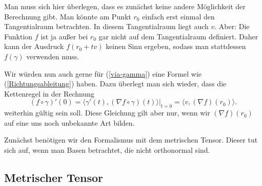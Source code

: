 \documentclass[a4paper,12pt,fleqn,dvipdfmx]{article}
\begin{document}
Man muss sich hier überlegen, dass es zunächst keine andere Möglichkeit
der Berechnung gibt. Man könnte am Punkt $r_0$ einfach erst einmal
den Tangentialraum betrachten. In diesem Tangentialraum liegt auch
$v$. Aber: Die Funktion $f$ ist ja außer bei $r_0$
gar nicht auf dem Tangentialraum definiert. Daher kann der Ausdruck
$f(r_0+tv)$ keinen Sinn ergeben, sodass man stattdessen
$f(\gamma)$ verwenden muss.

Wir würden nun auch gerne für (\ref{via-gamma}) eine Formel
wie (\ref{Richtungsableitung}) haben. Dazu überlegt man sich wieder,
dass die Kettenregel in der Rechnung
\begin{equation}
(f\circ\gamma)'(0)
= \langle \gamma'(t),(\nabla f\circ\gamma)(t)\rangle\Big|_{t=0}
= \langle v,(\nabla f)(r_0)\rangle.
\end{equation}
weiterhin gültig sein soll. Diese Gleichung gilt aber nur,
wenn wir $(\nabla f)(r_0)$ auf eine uns noch unbekannte Art
bilden.

Zunächst benötigen wir den Formalismus mit dem metrischen Tensor.
Dieser tut sich auf, wenn man Basen betrachtet, die nicht
orthonormal sind.

\subsection{Metrischer Tensor}
\end{document}

